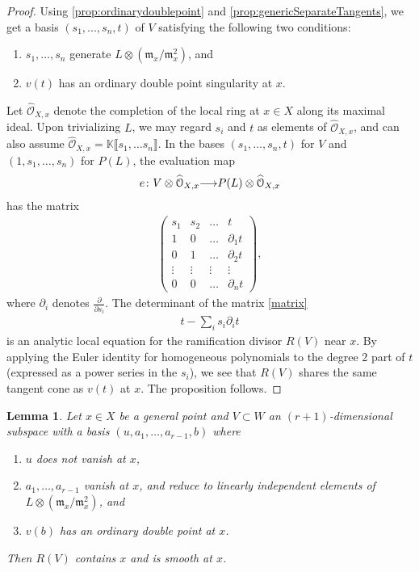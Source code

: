 \documentclass[11pt,reqno]{amsart}
\theoremstyle{plain}
\newtheorem{lemma}[theorem]{Lemma}
\theoremstyle{definition}
\theoremstyle{remark}
\numberwithin{equation}{section}
\renewcommand{\k}{\mathbb{K}}
\renewcommand{\to}{{\longrightarrow}}
\numberwithin{equation}{section}
\renewcommand{\O}{\mathcal O}
\begin{document}
\begin{proof}
  Using \autoref{prop:ordinarydoublepoint} and \autoref{prop:genericSeparateTangents}, we get a basis $(s_{1}, ..., s_{n}, t)$ of $V$ satisfying the following two conditions:
  \begin{enumerate}
      \item $s_{1}, \dots, s_{n}$ generate $L \otimes ({\mathfrak m}_{x}/{\mathfrak m}^{2}_{x})$, and
      \item $v(t)$ has an ordinary double point singularity at $x$.
    \end{enumerate}  

    Let $\widehat{\O}_{X,x}$ denote the completion of the local ring at $x \in X$ along its maximal ideal.  Upon trivializing $L$, we may regard $s_{i}$ and $t$ as elements of $\widehat{\O}_{X,x}$, and can also assume  $\widehat{\O}_{X,x} = \k\llbracket s_{1}, \dots s_{n}\rrbracket$.
    In the bases $(s_1, \dots, s_n, t)$ for $V$ and $(1, s_1, \dots, s_n)$ for $P(L)$, the evaluation map 
\begin{align*}
  e\from V \otimes \widehat{\O}_{X,x} \to P(L) \otimes \widehat{\O}_{X,x}
\end{align*}
has the matrix
\begin{align}\label{matrix}
\begin{pmatrix}
  s_{1} & s_{2} & \dots & t \\
  1 & 0 & \dots & \partial_{1}t \\
  0 & 1 & \dots & \partial_{2}t \\
  \vdots & \vdots & \vdots & \vdots \\
  0 & 0 & \dots & \partial_{n}t
\end{pmatrix},
\end{align}
where $\partial_{i}$ denotes $\frac{\partial}{\partial s_{i}}$.
The determinant of the matrix \eqref{matrix}
\begin{align*}
  t - \sum_{i}s_{i}\partial_{i}t
\end{align*}
is an analytic local equation for the ramification divisor $R(V)$ near $x$.
By applying the Euler identity for homogeneous polynomials to the degree 2 part of $t$ (expressed as a power series in the $s_i$), we see that $R(V)$ shares the same tangent cone as $v(t)$ at $x$.
The proposition follows.
\end{proof}

\begin{lemma}\label{lem:basepointfree}
  Let $x \in X$ be a general point and $V \subset W$ an $(r+1)$-dimensional subspace with a basis $(u, a_1,\dots, a_{r-1},b)$ where
  \begin{enumerate}
    \item $u$ does not vanish at $x$,
    \item $a_1, \dots , a_{r-1}$ vanish at $x$, and reduce to linearly independent elements of $L \otimes ({\mathfrak m}_{x}/{\mathfrak m}^{2}_{x})$, and
    \item $v(b)$ has an ordinary double point at $x$. 
  \end{enumerate}
  Then $R(V)$ contains $x$ and is smooth at $x$.
\end{lemma}
\end{document}
